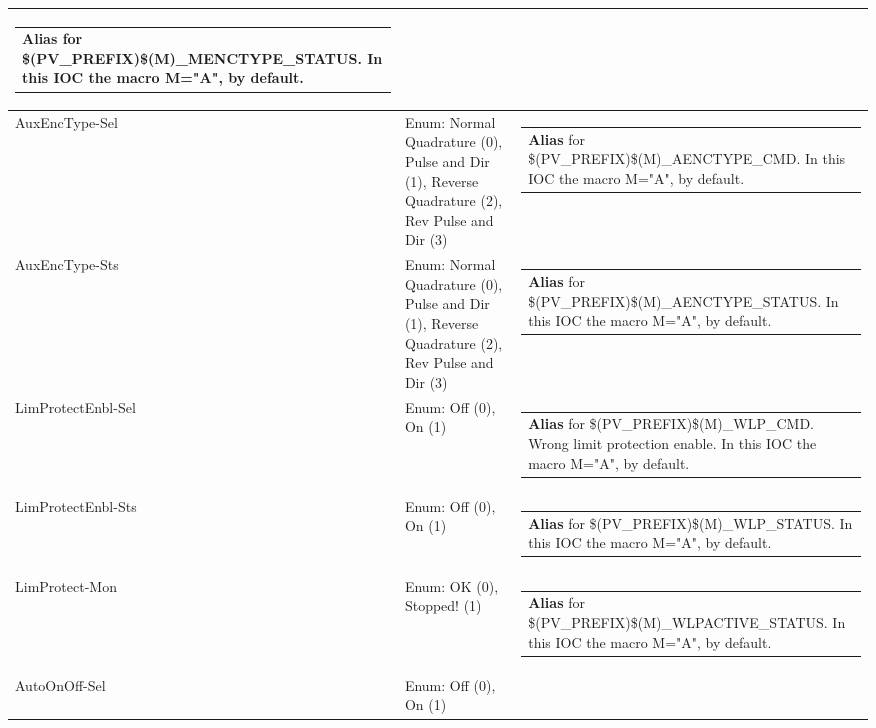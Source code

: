 \documentclass[openany]{article}
\begin{document}
\begin{longtable}{| m{4.5cm} m{2.5cm}  m{8.5cm} |}
\begin{tabular}{@{}m{6cm}@{}}
                \textbf{\color{blue} Alias} for \$(PV\_PREFIX)\$(M)\_MENCTYPE\_STATUS. In this IOC the macro M="A", by default.
            \end{tabular} \hypertarget{pv:aux-enc-type}{}\\ \hline
        AuxEncType-Sel & Enum: Normal Quadrature (0), Pulse and Dir (1), Reverse Quadrature (2), Rev Pulse and Dir (3) & \begin{tabular}{@{}m{6cm}@{}}
                \textbf{\color{blue} Alias} for \$(PV\_PREFIX)\$(M)\_AENCTYPE\_CMD. In this IOC the macro M="A", by default.
            \end{tabular} \hypertarget{}{}\\ \hline
        AuxEncType-Sts & Enum: Normal Quadrature (0), Pulse and Dir (1), Reverse Quadrature (2), Rev Pulse and Dir (3) & \begin{tabular}{@{}m{6cm}@{}}
                \textbf{\color{blue} Alias} for \$(PV\_PREFIX)\$(M)\_AENCTYPE\_STATUS. In this IOC the macro M="A", by default.
            \end{tabular} \hypertarget{pv:lim-protect-enbl}{}\\ \hline
        LimProtectEnbl-Sel & Enum: Off (0), On (1) & \begin{tabular}{@{}m{6cm}@{}}
                \textbf{\color{blue} Alias} for \$(PV\_PREFIX)\$(M)\_WLP\_CMD. Wrong limit protection enable. In this IOC the macro M="A", by default.
            \end{tabular} \hypertarget{}{}\\ \hline
        LimProtectEnbl-Sts & Enum: Off (0), On (1) & \begin{tabular}{@{}m{6cm}@{}}
                \textbf{\color{blue} Alias} for \$(PV\_PREFIX)\$(M)\_WLP\_STATUS. In this IOC the macro M="A", by default.
            \end{tabular} \hypertarget{pv:lim-protect-mon}{}\\ \hline
        LimProtect-Mon & Enum: OK (0), Stopped! (1) & \begin{tabular}{@{}m{6cm}@{}}
                \textbf{\color{blue} Alias} for \$(PV\_PREFIX)\$(M)\_WLPACTIVE\_STATUS. In this IOC the macro M="A", by default.
            \end{tabular} \hypertarget{pv:auto-on-off}{}\\ \hline
        AutoOnOff-Sel & Enum: Off (0), On (1) & \begin{tabular}{@{}m{6cm}@{}}

\end{tabular}
\end{longtable}
\end{document}
